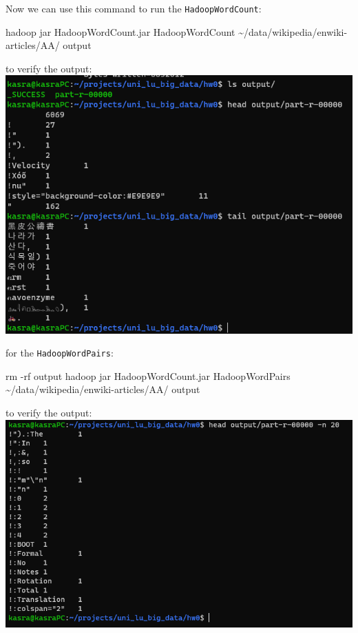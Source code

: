 \documentclass[
]{article}
\newenvironment{Shaded}{}{}
\newcommand{\ExtensionTok}[1]{#1}
\newcommand{\FunctionTok}[1]{\textcolor[rgb]{0.02,0.16,0.49}{#1}}
\newcommand{\NormalTok}[1]{#1}
\begin{document}
Now we can use this command to run the \texttt{HadoopWordCount}:

\begin{Shaded}
\begin{Highlighting}[]
\ExtensionTok{hadoop}\NormalTok{ jar HadoopWordCount.jar HadoopWordCount \textasciitilde{}/data/wikipedia/enwiki{-}articles/AA/ output}
\end{Highlighting}
\end{Shaded}

to verify the output:\\
\includegraphics{image-7.png}

for the \texttt{HadoopWordPairs}:

\begin{Shaded}
\begin{Highlighting}[]
\FunctionTok{rm}\NormalTok{ {-}rf output}
\ExtensionTok{hadoop}\NormalTok{ jar HadoopWordCount.jar HadoopWordPairs \textasciitilde{}/data/wikipedia/enwiki{-}articles/AA/ output}
\end{Highlighting}
\end{Shaded}

to verify the output:\\
\includegraphics{image-8.png}
\end{document}
